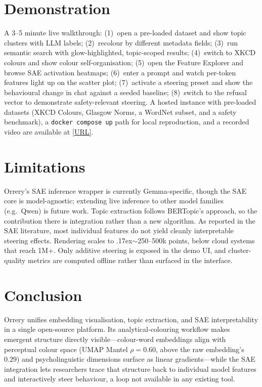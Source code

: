\documentclass[11pt]{article}
\begin{document}
\section{Demonstration}
\label{sec:demo}

A 3--5 minute live walkthrough: (1)~open a pre-loaded dataset and show topic
clusters with LLM labels; (2)~recolour by different metadata fields;
(3)~run semantic search with glow-highlighted, topic-scoped results;
(4)~switch to XKCD colours and show colour self-organisation; (5)~open the
Feature Explorer and browse SAE activation heatmaps; (6)~enter a prompt and
watch per-token features light up on the scatter plot; (7)~activate a
steering preset and show the behavioural change in chat against a seeded
baseline; (8)~switch to the refusal vector to demonstrate safety-relevant
steering. A hosted instance with pre-loaded datasets (XKCD Colours, Glasgow
Norms, a WordNet subset, and a safety benchmark), a \texttt{docker compose
up} path for local reproduction, and a recorded video are available at
\url{[URL]}.

\section{Limitations}
\label{sec:limitations}

Orrery's SAE inference wrapper is currently Gemma-specific, though the SAE
core is model-agnostic; extending live inference to other model families
(e.g.\ Qwen) is future work. Topic extraction follows BERTopic's approach,
so the contribution there is integration rather than a new algorithm. As
reported in the SAE literature, most individual features do not yield
cleanly interpretable steering effects. Rendering scales to
\raise.17ex\hbox{$\scriptstyle\sim$}250--500k points, below cloud systems
that reach 1M+. Only additive steering is exposed in the demo UI, and
cluster-quality metrics are computed offline rather than surfaced in the
interface.

\section{Conclusion}
\label{sec:conclusion}

Orrery unifies embedding visualisation, topic extraction, and SAE
interpretability in a single open-source platform. Its analytical-colouring
workflow makes emergent structure directly visible---colour-word embeddings
align with perceptual colour space (UMAP Mantel $\rho = 0.60$, above the
raw embedding's $0.29$) and psycholinguistic dimensions surface as linear
gradients---while the SAE integration lets researchers trace that structure
back to individual model features and interactively steer behaviour, a
loop not available in any existing tool.
\end{document}
